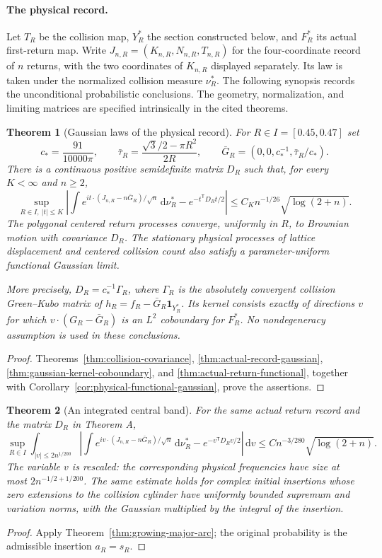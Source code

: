 \documentclass[11pt,reqno]{amsart}
\numberwithin{equation}{section}
\newtheorem{maintheorem}{Theorem}
\theoremstyle{definition}\newtheorem{definition}[theorem]{Definition}
\theoremstyle{remark}\newtheorem{remark}[theorem]{Remark}
\newcommand{\dd}{\,\mathrm d}\newcommand{\one}{\mathbf1}
\begin{document}
\paragraph{The physical record.}
Let $T_R$ be the collision map, $Y_R^*$ the section constructed below,
and $F_R^*$ its actual first-return map. Write
$J_{n,R}=(K_{n,R},N_{n,R},T_{n,R})$ for the four-coordinate record of
$n$ returns, with the two coordinates of $K_{n,R}$ displayed separately.
Its law is taken under the normalized collision measure $\nu_R^*$.
The following synopsis records the unconditional probabilistic
conclusions. The geometry, normalization, and limiting matrices are
specified intrinsically in the cited theorems.

\begin{maintheorem}[Gaussian laws of the physical record]
\label{thm:intro-gaussian}
For $R\in I=[0.45,0.47]$ set
\[
 c_* = \frac{91}{10000\pi},\qquad
 \bar\tau_R=\frac{\sqrt3/2-\pi R^2}{2R},\qquad
 \bar G_R=(0,0,c_*^{-1},\bar\tau_R/c_*).
\]
There is a continuous positive semidefinite matrix $D_R$ such that,
for every $K<\infty$ and $n\ge2$,
\[
 \sup_{R\in I,\ |t|\le K}
 \left|\int e^{it\cdot(J_{n,R}-n\bar G_R)/\sqrt n}\dd\nu_R^*
              -e^{-t^{\mathsf T}D_Rt/2}\right|
 \le C_Kn^{-1/26}\sqrt{\log(2+n)}.
\]
The polygonal centered return processes converge, uniformly in $R$,
to Brownian motion with covariance $D_R$. The stationary physical
processes of lattice displacement and centered collision count also
satisfy a parameter-uniform functional Gaussian limit.

More precisely, $D_R=c_*^{-1}\Gamma_R$, where $\Gamma_R$ is the
absolutely convergent collision Green--Kubo matrix of
$h_R=f_R-\bar G_R\one_{Y_R^*}$. Its kernel consists exactly of directions
$v$ for which $v\cdot(G_R-\bar G_R)$ is an $L^2$ coboundary for
$F_R^*$. No nondegeneracy assumption is used in these conclusions.
\end{maintheorem}
\begin{proof}
Theorems~\ref{thm:collision-covariance},
\ref{thm:actual-record-gaussian}, \ref{thm:gaussian-kernel-coboundary},
and \ref{thm:actual-return-functional}, together with
Corollary~\ref{cor:physical-functional-gaussian}, prove the assertions.
\end{proof}

\begin{maintheorem}[An integrated central band]
\label{thm:intro-major-arc}
For the same actual return record and the matrix $D_R$ in Theorem A,
\[
 \sup_{R\in I}\int_{|v|\le2n^{1/200}}
 \left|\int e^{iv\cdot(J_{n,R}-n\bar G_R)/\sqrt n}\dd\nu_R^*
                       -e^{-v^{\mathsf T}D_Rv/2}\right|\dd v
       \le Cn^{-3/280}\sqrt{\log(2+n)}.
\]
The variable $v$ is rescaled: the corresponding physical frequencies
have size at most $2n^{-1/2+1/200}$. The same estimate holds for complex
initial insertions whose zero extensions to the collision cylinder
have uniformly bounded supremum and variation norms, with the Gaussian
multiplied by the integral of the insertion.
\end{maintheorem}
\begin{proof}
Apply Theorem~\ref{thm:growing-major-arc}; the original probability is
the admissible insertion $a_R=s_R$.
\end{proof}
\end{document}

